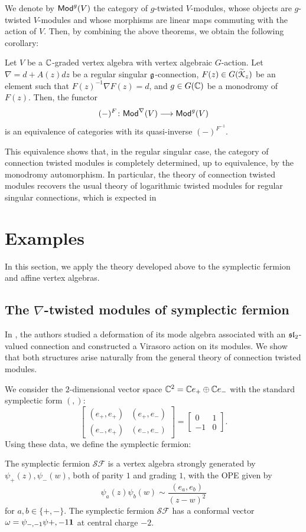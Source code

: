 \documentclass[final,reqno]{amsart}
\begin{document}
We denote by $\mathsf{Mod}^g(V)$ the category of $g$-twisted $V$-modules, whose objects are $g$-twisted $V$-modules and whose morphisms are linear maps commuting with the action of $V$. Then, by combining the above theorems, we obtain the following corollary:
\begin{cor}\label{cor:main B}
    Let $V$ be a $\mathbb{C}$-graded vertex algebra with vertex algebraic $G$-action. Let $\nabla=d+A(z)dz$ be a regular singular $\mathfrak{g}$-connection, $F(z)\in G(\widetilde{\EuScript{K}}_z)$ be an element such that $F(z)^{-1}\nabla F(z)=d$, and $g\in G(\mathbb{C})$ be a monodromy of $F(z)$. Then, the functor
    \[
        (-)^F\colon \mathsf{Mod}^\nabla(V)\longrightarrow \mathsf{Mod}^g(V)
    \]
    is an equivalence of categories with its quasi-inverse $(-)^{F^{-1}}$.
\end{cor}
This equivalence shows that, in the regular singular case, the category of connection twisted modules is completely determined, up to equivalence, by the monodromy automorphism. In particular, the theory of connection twisted modules recovers the usual theory of logarithmic twisted modules for regular singular connections, which is expected in \cite{FL25,FL26}

\section{Examples}\label{s:example}
In this section, we apply the theory developed above to the symplectic fermion and affine vertex algebras.

\subsection{The $\nabla$-twisted modules of symplectic fermion}
In \cite{FL25}, the authors studied a deformation of its mode algebra associated with an $\mathfrak{sl}_2$-valued connection and constructed a Virasoro action on its modules. We show that both structures arise naturally from the general theory of connection twisted modules.

We consider the $2$-dimensional vector space $\mathbb{C}^2=\mathbb{C} e_+\oplus\mathbb{C} e_-$ with the standard symplectic form $(,)$:
\[
    \begin{bmatrix}
        (e_+,e_+) & (e_+,e_-)\\
        (e_-,e_+) & (e_-,e_-)
    \end{bmatrix}
    =
    \begin{bmatrix}
        0 & 1 \\
        -1 & 0
    \end{bmatrix}
    .
\]
Using these data, we define the symplectic fermion:
\begin{dfn}
    The symplectic fermion $\mathcal{SF}$ is a vertex algebra strongly generated by $\psi_+(z),\psi_-(w)$, both of parity $1$ and grading $1$, with the OPE given by
    \[
        \psi_a(z)\psi_b(w)\sim \frac{(e_a,e_b)}{(z-w)^2}
    \]
for $a,b\in\{+,-\}$. The symplectic fermion $\mathcal{SF}$ has a conformal vector $\omega=\psi_{-,-1}\psi{+,-1}\mathbf{1}$ at central charge $-2$.
\end{dfn}
\end{document}
